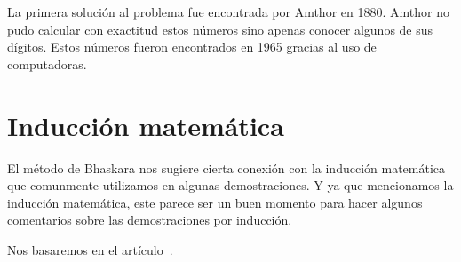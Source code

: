 La primera solución al problema fue encontrada por Amthor en 1880. Amthor no
pudo calcular con exactitud estos números sino apenas conocer algunos de sus
dígitos. Estos números fueron encontrados en 1965 gracias al uso de
computadoras. 



\section*{Inducción matemática}

El método de Bhaskara nos sugiere cierta conexión con la inducción matemática
que comunmente utilizamos en algunas demostraciones.  Y ya que mencionamos la
inducción matemática, este parece ser un buen momento para hacer algunos
comentarios sobre las demostraciones por inducción. 

Nos basaremos en el
artículo~\cite{MR1519060}. 

